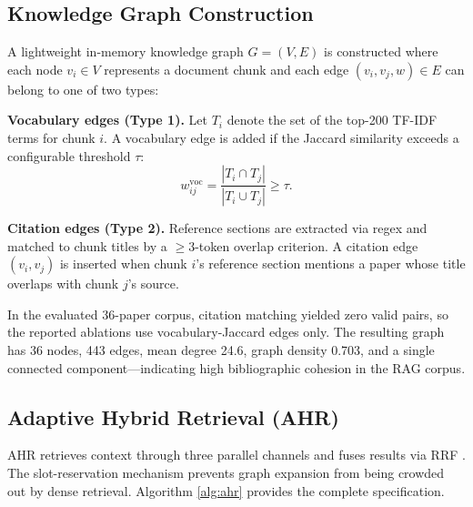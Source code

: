 \documentclass[conference,10pt,twocolumn]{IEEEtran}
\begin{document}
\subsection{Knowledge Graph Construction}

A lightweight in-memory knowledge graph $G = (V, E)$ is constructed where each node $v_i \in V$ represents a document chunk and each edge $(v_i, v_j, w) \in E$ can belong to one of two types:

\textbf{Vocabulary edges (Type 1).} Let $T_i$ denote the set of the top-200 TF-IDF terms for chunk $i$. A vocabulary edge is added if the Jaccard similarity exceeds a configurable threshold $\tau$:
\begin{equation}
  w^{\mathrm{voc}}_{ij} = \frac{|T_i \cap T_j|}{|T_i \cup T_j|} \geq \tau.
  \label{eq:jaccard}
\end{equation}

\textbf{Citation edges (Type 2).} Reference sections are extracted via regex and matched to chunk titles by a $\geq 3$-token overlap criterion. A citation edge $(v_i, v_j)$ is inserted when chunk $i$'s reference section mentions a paper whose title overlaps with chunk $j$'s source.

In the evaluated 36-paper corpus, citation matching yielded zero valid pairs, so the reported ablations use vocabulary-Jaccard edges only. The resulting graph has 36 nodes, 443 edges, mean degree 24.6, graph density 0.703, and a single connected component---indicating high bibliographic cohesion in the RAG corpus.

\subsection{Adaptive Hybrid Retrieval (AHR)}

AHR retrieves context through three parallel channels and fuses results via RRF \cite{cormack2009rrf}. The slot-reservation mechanism prevents graph expansion from being crowded out by dense retrieval. Algorithm \ref{alg:ahr} provides the complete specification.
\end{document}
